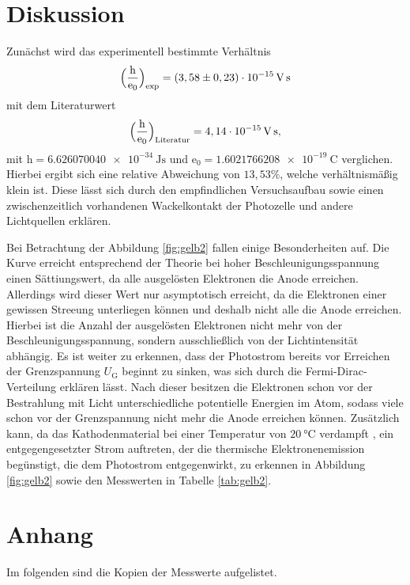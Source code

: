 \section{Diskussion}
\label{sec:Diskussion}

Zunächst wird das experimentell bestimmte Verhältnis 
\begin{align*}
\Bigl(\frac{\mathrm{h}}{\mathrm{e_0}}\Bigr)_\text{exp} = (3,58 \pm 0,23)\cdot 10^{-15}\,\si{\volt\second} 
\end{align*}
mit dem Literaturwert 
\begin{align*}
\Bigl(\frac{\mathrm{h}}{\mathrm{e_0}}\Bigr)_\text{Literatur} = 4,14 \cdot 10^{-15}\,\si{\volt\second}, 
\end{align*}
mit $\mathrm{h} = \SI{6.626070040e-34}{\joule\second}$ \cite{h} und $\mathrm{e_0} = \SI{1.6021766208e-19}{\coulomb}$ \cite{e} verglichen.
Hierbei ergibt sich eine relative Abweichung von $13,53\%$, welche verhältnismäßig klein ist.
Diese lässt sich durch den empfindlichen Versuchsaufbau sowie einen zwischenzeitlich vorhandenen
Wackelkontakt der Photozelle und andere Lichtquellen erklären.

\noindent Bei Betrachtung der Abbildung \ref{fig:gelb2} fallen einige Besonderheiten auf.
Die Kurve erreicht entsprechend der Theorie bei hoher Beschleunigungsspannung einen Sättiungswert,
da alle ausgelösten Elektronen die Anode erreichen. Allerdings wird dieser Wert nur asymptotisch erreicht, da die Elektronen einer gewissen Streeung unterliegen können und deshalb nicht alle die Anode erreichen.
Hierbei ist die Anzahl der ausgelösten Elektronen nicht mehr von der Beschleunigungsspannung, sondern ausschließlich von der Lichtintensität abhängig.
Es ist weiter zu erkennen, dass der Photostrom bereits vor Erreichen der Grenzspannung $U_\text{G}$
beginnt zu sinken, was sich durch die Fermi-Dirac-Verteilung erklären lässt. Nach dieser besitzen die
Elektronen schon vor der Bestrahlung mit Licht unterschiedliche potentielle Energien im Atom, sodass viele
schon vor der Grenzspannung nicht mehr die Anode erreichen können. Zusätzlich kann, da das 
Kathodenmaterial bei einer Temperatur von $\SI{20}{\celsius}$
verdampft \cite{kent}, ein entgegengesetzter Strom auftreten, 
der die thermische Elektronenemission begünstigt, die dem Photostrom entgegenwirkt, zu erkennen in Abbildung \ref{fig:gelb2}
sowie den Messwerten in Tabelle \ref{tab:gelb2}.

\section{Anhang}
\label{Anhang}
Im folgenden sind die Kopien der Messwerte aufgelistet.


